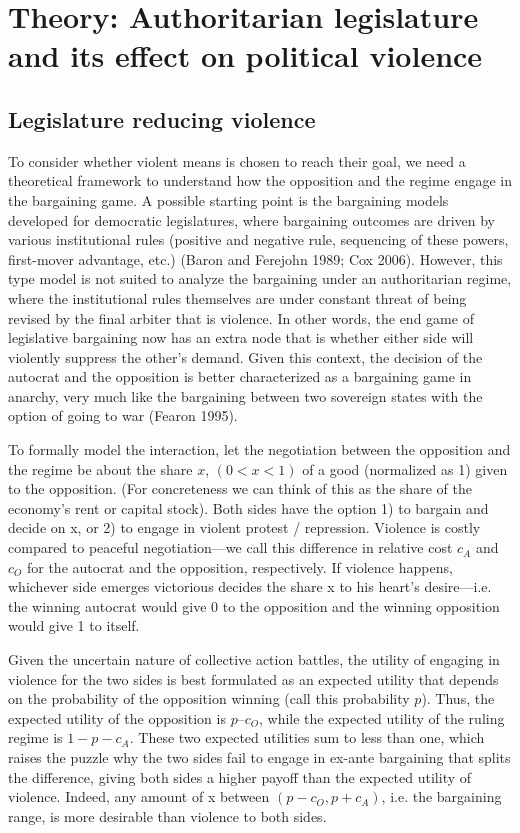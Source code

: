 \section{Theory: Authoritarian legislature and its effect on political violence}

\subsection{Legislature reducing violence}

To consider whether violent means is chosen to reach their goal, we need a theoretical framework to understand how the opposition and the regime engage in the bargaining game. A possible starting point is the bargaining models developed for democratic legislatures, where bargaining outcomes are driven by various institutional rules (positive and negative rule, sequencing of these powers, first-mover advantage, etc.) (Baron and Ferejohn 1989; Cox 2006). However, this type model is not suited to analyze the bargaining under an authoritarian regime, where the institutional rules themselves are under constant threat of being revised by the final arbiter that is violence. In other words, the end game of legislative bargaining now has an extra node that is whether either side will violently suppress the other’s demand. Given this context, the decision of the autocrat and the opposition is better characterized as a bargaining game in anarchy, very much like the bargaining between two sovereign states with the option of going to war (Fearon 1995).

To formally model the interaction, let the negotiation between the opposition and the regime be about the share $x$, $(0 < x < 1)$ of a good (normalized as 1) given to the opposition. (For concreteness we can think of this as the share of the economy’s rent or capital stock). Both sides have the option 1) to bargain and decide on x, or 2) to engage in violent protest / repression. Violence is costly compared to peaceful negotiation---we call this difference in relative cost $c_A$ and $c_O$ for the autocrat and the opposition, respectively. If violence happens, whichever side emerges victorious decides the share x to his heart’s desire---i.e. the winning autocrat would give 0 to the opposition and the winning opposition would give 1 to itself.

Given the uncertain nature of collective action battles, the utility of engaging in violence for the two sides is best formulated as an expected utility that depends on the probability of the opposition winning (call this probability $p$). Thus, the expected utility of the opposition is $p – c_O$, while the expected utility of the ruling regime is $1 - p - c_A$. These two expected utilities sum to less than one, which raises the puzzle why the two sides fail to engage in ex-ante bargaining that splits the difference, giving both sides a higher payoff than the expected utility of violence. Indeed, any amount of x between $(p - c_O, p + c_A)$, i.e. the bargaining range, is more desirable than violence to both sides.

